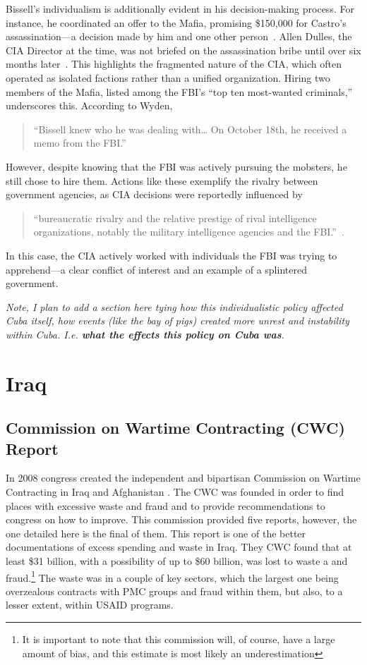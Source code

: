 \documentclass{article}
\begin{document}
    Bissell's individualism is additionally evident in his decision-making process. For instance, he coordinated an offer to the Mafia, promising \$150,000 for Castro's assassination—a decision made by him and one other person~\cite{Wyden1979}. Allen Dulles, the CIA Director at the time, was not briefed on the assassination bribe until over six months later~\cite{Wyden1979}. This highlights the fragmented nature of the CIA, which often operated as isolated factions rather than a unified organization. Hiring two members of the Mafia, listed among the FBI's “top ten most-wanted criminals,” underscores this. According to Wyden, \begin{quotation}
        “Bissell knew who he was dealing with… On October 18th, he received a memo from the FBI.”~\cite{Wyden1979}
    \end{quotation}  
    However, despite knowing that the FBI was actively pursuing the mobsters, he still chose to hire them. Actions like these exemplify the rivalry between government agencies, as CIA decisions were reportedly influenced by 
    \begin{quotation} 
        “bureaucratic rivalry and the relative prestige of rival intelligence organizations, notably the military intelligence agencies and the FBI.”~\cite{JeffreysJones2003}.
    \end{quotation} 
    In this case, the CIA actively worked with individuals the FBI was trying to apprehend—a clear conflict of interest and an example of a splintered government.

    \textit{Note, I plan to add a section here tying how this individualistic policy affected Cuba itself, how events (like the bay of pigs) created more unrest and instability within Cuba. I.e. \textbf{what the effects this policy on Cuba was}.}
\section{Iraq}
    \subsection{Commission on Wartime Contracting (CWC) Report}
        In 2008 congress created the independent and bipartisan Commission on Wartime Contracting in Iraq and Afghanistan \cite{CWC_2011}. The CWC was founded in order to find places with excessive waste and fraud and to provide recommendations to congress on how to improve. This commission provided five reports, however, the one detailed here is the final of them. This report is one of the better documentations of excess spending and waste in Iraq. They CWC found that at least \$31 billion, with a possibility of up to \$60 billion, was lost to waste a and fraud.\footnote{It is important to note that this commission will, of course, have a large amount of bias, and this estimate is most likely an underestimation} The waste was in a couple of key sectors, which the largest one being overzealous contracts with PMC groups and fraud within them, but also, to a lesser extent, within USAID programs.
\end{document}

